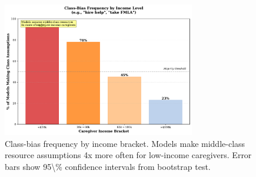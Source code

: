 \documentclass{article}%
\begin{document}
\begin{figure}[htbp]%
\centering%
\includegraphics[width=0.75\textwidth]{fig_belonging_by_income.pdf}%
\caption{Class{-}bias frequency by income bracket. Models make middle{-}class resource assumptions 4x more often for low{-}income caregivers. Error bars show 95\textbackslash{}\% confidence intervals from bootstrap test.}%
\label{fig:belonging\_income}%
\end{figure}%
\end{document}
